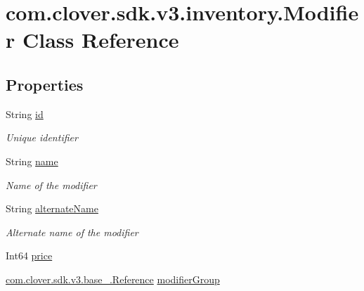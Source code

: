 \hypertarget{classcom_1_1clover_1_1sdk_1_1v3_1_1inventory_1_1_modifier}{}\section{com.\+clover.\+sdk.\+v3.\+inventory.\+Modifier Class Reference}
\label{classcom_1_1clover_1_1sdk_1_1v3_1_1inventory_1_1_modifier}
\subsection*{Properties}
\begin{DoxyCompactItemize}
\item 
String \hyperlink{classcom_1_1clover_1_1sdk_1_1v3_1_1inventory_1_1_modifier_a2733daf601464bc1b94fdaba94021cae}{id}
\begin{DoxyCompactList}\small\item\em Unique identifier \end{DoxyCompactList}\item 
String \hyperlink{classcom_1_1clover_1_1sdk_1_1v3_1_1inventory_1_1_modifier_aeaf5b7b48c942f98bc944980f8e546ea}{name}
\begin{DoxyCompactList}\small\item\em Name of the modifier \end{DoxyCompactList}\item 
String \hyperlink{classcom_1_1clover_1_1sdk_1_1v3_1_1inventory_1_1_modifier_ac60e1ea4c10282f8c9e7efa6e86abb10}{alternate\+Name}
\begin{DoxyCompactList}\small\item\em Alternate name of the modifier \end{DoxyCompactList}\item 
Int64 \hyperlink{classcom_1_1clover_1_1sdk_1_1v3_1_1inventory_1_1_modifier_ad15cd577cfeeb0659567c1dbd799633e}{price}
\item 
\hyperlink{classcom_1_1clover_1_1sdk_1_1v3_1_1base___1_1_reference}{com.\+clover.\+sdk.\+v3.\+base\+\_\+.\+Reference} \hyperlink{classcom_1_1clover_1_1sdk_1_1v3_1_1inventory_1_1_modifier_ac27705ac187848b6e9a6ab780315302e}{modifier\+Group}
\end{DoxyCompactItemize}


